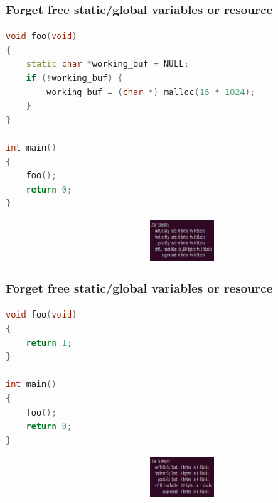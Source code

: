 \documentclass{bredelebeamer}
\begin{document}
\begin{frame}[fragile]
	\frametitle{Forget free static/global variables or resource}
	\begin{center}
		\begin{lstlisting}[language=C++]
void foo(void)
{
	static char *working_buf = NULL;
	if (!working_buf) {
		working_buf = (char *) malloc(16 * 1024);
	}
}

int main()
{
	foo();
	return 0;
}

		\end{lstlisting}
	\end{center}

	\begin{center}
		\begin{figure}
			\includegraphics[height=1.5cm,width=11cm]{forget_free_static.png}
		\end{figure}
	\end{center}
\end{frame}

\begin{frame}[fragile]
	\frametitle{Forget free static/global variables or resource}
	\begin{center}
		\begin{lstlisting}[language=C++]
void foo(void)
{
	return 1;
}

int main()
{
	foo();
	return 0;
}

		\end{lstlisting}
	\end{center}

	\begin{center}
		\begin{figure}
			\includegraphics[height=1.5cm,width=11cm]{forget_free_static2.png}
		\end{figure}
	\end{center}
\end{frame}
\end{document}
